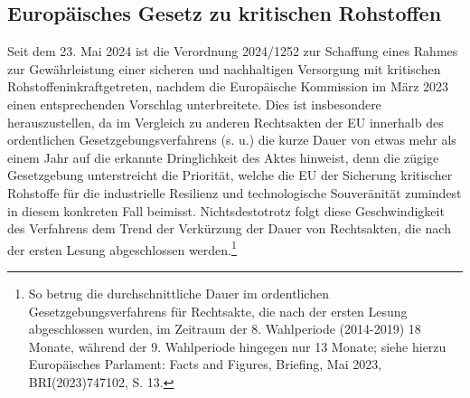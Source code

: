 \documentclass[12pt,a4paper,oneside]{book} %
\begin{document}
	\subsection{Europäisches Gesetz zu kritischen Rohstoffen}\label{EU-Verordnung}
	
	
	Seit dem 23. Mai 2024 ist die Verordnung 2024/1252 \glqq zur Schaffung eines Rahmes zur Gewährleistung einer sicheren und nachhaltigen Versorgung mit kritischen Rohstoffen\grqq inkraftgetreten, nachdem die Europäische Kommission im März 2023 einen entsprechenden Vorschlag unterbreitete. Dies ist insbesondere herauszustellen, da im Vergleich zu anderen Rechtsakten der EU innerhalb des ordentlichen Gesetzgebungsverfahrens (s. u.) die kurze Dauer von etwas mehr als einem Jahr auf die erkannte Dringlichkeit des Aktes hinweist, denn die zügige Gesetzgebung unterstreicht die Priorität, welche die EU der Sicherung kritischer Rohstoffe für die industrielle Resilienz und technologische Souveränität zumindest in diesem konkreten Fall beimisst. Nichtsdestotrotz folgt diese Geschwindigkeit des Verfahrens dem Trend der Verkürzung der Dauer von Rechtsakten, die nach der ersten Lesung abgeschlossen werden.\footnote{So betrug die durchschnittliche Dauer im ordentlichen Gesetzgebungsverfahrens für Rechtsakte, die nach der ersten Lesung abgeschlossen wurden, im Zeitraum der 8. Wahlperiode (2014-2019) 18 Monate, während der 9. Wahlperiode hingegen nur 13 Monate; siehe hierzu Europäisches Parlament: Facts and Figures, Briefing, Mai 2023, BRI(2023)747102, S. 13.} 
	
\end{document}
